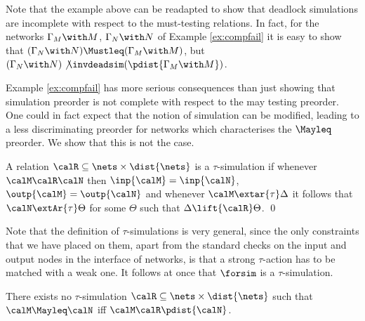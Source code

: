 \documentclass{LMCS}
\begin{document}
  Note that the example above can be readapted to show that 
  deadlock simulations are incomplete with respect to the 
  must-testing relations. 
  In fact, for the networks $\Gamma_M \with M$, $\Gamma_N \with N$ of 
  Example \ref{ex:compfail} it is easy to show that 
  $(\Gamma_N \with N) \Mustleq (\Gamma_M \with M)$, but 
  $(\Gamma_N \with N) \not\invdeadsim (\pdist{\Gamma_M \with M})$. 
  
 Example \ref{ex:compfail} has more serious consequences than just showing that simulation 
  preorder is not complete with respect to the may testing preorder. 
  One could in fact expect that the notion of simulation can be modified, 
  leading to a less discriminating preorder for networks which characterises 
  the $\Mayleq$ preorder. We show that this is not the case. 
  
  \begin{defi}
  A relation $\calR \subseteq \nets \times \dist{\nets}$ is 
  a $\tau$-simulation if whenever $\calM \calR \calN$ then 
  $\inp{\calM} = \inp{\calN}$, $\outp{\calM} = \outp{\calN}$ 
  and whenever $\calM \extar{\tau} \Delta$ it follows that 
  $\calN \extAr{\tau} \Theta$ for some $\Theta$ such that 
  $\Delta \lift{\calR} \Theta$. \qed
  \end{defi}
  Note that the definition of $\tau$-simulations is very general, 
  since the only constraints that we have placed on them, 
  apart from the standard checks on the input and output nodes 
  in the interface of networks, is that a strong $\tau$-action 
  has to be matched with a weak one. It follows at once 
  that $\forsim$ is a $\tau$-simulation.
    
  \begin{thm}
  \label{thm:nolift}
  There exists no $\tau$-simulation $\calR \subseteq \nets \times \dist{\nets}$ such that
  $\calM \Mayleq \calN$ iff $\calM \calR \pdist{\calN}$.
\end{thm}
  
\end{document}
